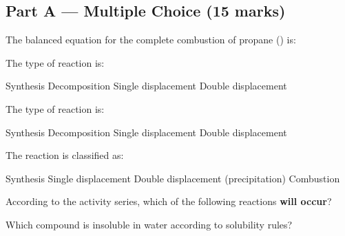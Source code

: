 \documentclass[addpoints]{exam}
\begin{document}
\newpage
\begin{questions}

\section*{Part A --- Multiple Choice (15 marks)}
\vspace{5mm}

\question[1] The balanced equation for the complete combustion of propane () is:
\begin{choices}
    \choice {}
    \correctchoice {}
    \choice {}
    \choice {}
\end{choices}

\question[1] The type of reaction  is:
\begin{choices}
    \choice Synthesis
    \correctchoice Decomposition
    \choice Single displacement
    \choice Double displacement
\end{choices}

\question[1] The type of reaction  is:
\begin{choices}
    \choice Synthesis
    \choice Decomposition
    \correctchoice Single displacement
    \choice Double displacement
\end{choices}

\question[1] The reaction  is classified as:
\begin{choices}
    \choice Synthesis
    \choice Single displacement
    \correctchoice Double displacement (precipitation)
    \choice Combustion
\end{choices}

\question[1] According to the activity series, which of the following reactions
\textbf{will occur}?
\begin{choices}
    \choice {}
    \correctchoice {}
    \choice {}
    \choice {}
\end{choices}

\question[1] Which compound is insoluble in water according to solubility rules?
\begin{choices}
    \choice {}
    \choice {}
    \correctchoice {}
    \choice {}
\end{choices}


\end{questions}
\end{document}

